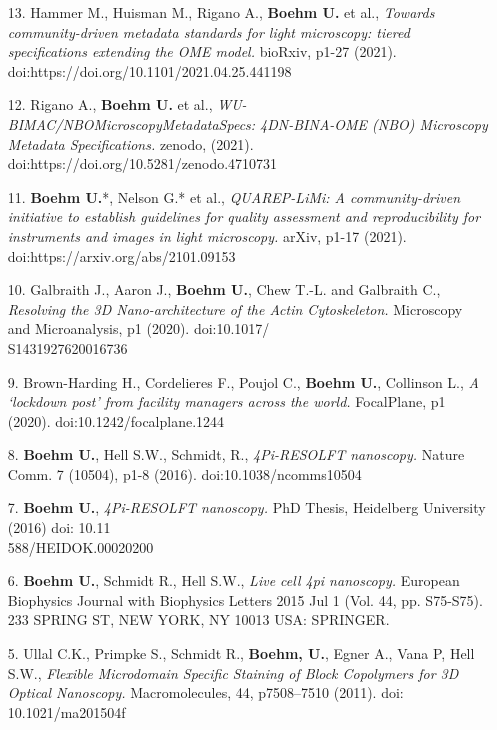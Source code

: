 \documentclass[margin,line]{res}
\begin{document}
\begin{resume}
\begin{enumerate}[leftmargin=*]
\item[13.] Hammer M., Huisman M., Rigano A., {\bf Boehm U.} et al., {\it Towards community-driven metadata standards for light microscopy: tiered specifications extending the OME model.} bioRxiv, p1-27 (2021). doi:https://doi.org/10.1101/2021.04.25.441198

\item[12.] Rigano A., {\bf Boehm U.} et al., {\it WU-BIMAC/NBOMicroscopyMetadataSpecs: 4DN-BINA-OME (NBO) Microscopy Metadata Specifications.} zenodo, (2021). \\doi:https://doi.org/10.5281/zenodo.4710731

\item[11.] {\bf Boehm U.}*, Nelson G.* et al., {\it QUAREP-LiMi: A community-driven initiative to establish guidelines for quality assessment and reproducibility for instruments and images in light microscopy.} arXiv, p1-17 (2021). doi:https://arxiv.org/abs/2101.09153

\item[10.] Galbraith J., Aaron J., {\bf Boehm U.}, Chew T.-L. and Galbraith C., {\it Resolving the 3D Nano-architecture of the Actin Cytoskeleton.} Microscopy and Microanalysis, p1 (2020). doi:10.1017/\\S1431927620016736

\item[9.] Brown-Harding H., Cordelieres F., Poujol C., {\bf Boehm U.}, Collinson L., {\it A ‘lockdown post’ from facility managers across the world.} FocalPlane, p1 (2020). doi:10.1242/focalplane.1244

\item[8.]  {\bf Boehm U.}, Hell S.W., Schmidt, R., {\it 4Pi-RESOLFT nanoscopy.} Nature Comm. 7 (10504), p1-8 (2016). doi:10.1038/ncomms10504

\item[7.] {\bf Boehm U.},  {\it 4Pi-RESOLFT nanoscopy.} PhD Thesis, Heidelberg University (2016) doi: 10.11\\588/HEIDOK.00020200

\item[6.] {\bf Boehm U.}, Schmidt R., Hell S.W., {\it Live cell 4pi nanoscopy.} European Biophysics Journal with Biophysics Letters 2015 Jul 1 (Vol. 44, pp. S75-S75). 233 SPRING ST, NEW YORK, NY 10013 USA: SPRINGER.

\item[5.] Ullal C.K., Primpke S., Schmidt R., {\bf Boehm, U.}, Egner A., Vana P, Hell S.W., {\it Flexible Microdomain Specific Staining of Block Copolymers for 3D Optical Nanoscopy.} Macromolecules, 44, p7508–7510 (2011). doi: 10.1021/ma201504f


\end{enumerate}
\end{resume}
\end{document}
